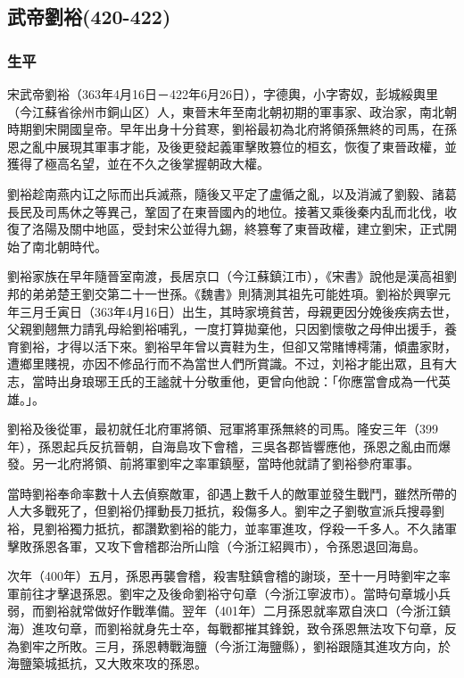 
\subsection{武帝劉裕\tiny(420-422)}

\subsubsection{生平}

宋武帝劉裕（363年4月16日－422年6月26日），字德輿，小字寄奴，彭城綏輿里（今江蘇省徐州市銅山区）人，東晉末年至南北朝初期的軍事家、政治家，南北朝時期劉宋開國皇帝。早年出身十分貧寒，劉裕最初為北府將領孫無終的司馬，在孫恩之亂中展現其軍事才能，及後更發起義軍擊敗篡位的桓玄，恢復了東晉政權，並獲得了極高名望，並在不久之後掌握朝政大權。

劉裕趁南燕内讧之际而出兵滅燕，隨後又平定了盧循之亂，以及消滅了劉毅、諸葛長民及司馬休之等異己，鞏固了在東晉國內的地位。接著又乘後秦内乱而北伐，收復了洛陽及關中地區，受封宋公並得九錫，終篡奪了東晉政權，建立劉宋，正式開始了南北朝時代。

劉裕家族在早年隨晉室南渡，長居京口（今江蘇鎮江市），《宋書》說他是漢高祖劉邦的弟弟楚王劉交第二十一世孫。《魏書》則猜測其祖先可能姓項。劉裕於興寧元年三月壬寅日（363年4月16日）出生，其時家境貧苦，母親更因分娩後疾病去世，父親劉翹無力請乳母給劉裕哺乳，一度打算拋棄他，只因劉懷敬之母伸出援手，養育劉裕，才得以活下來。劉裕早年曾以賣鞋为生，但卻又常賭博樗蒲，傾盡家財，遭鄉里賤視，亦因不修品行而不為當世人們所賞識。不过，刘裕才能出眾，且有大志，當時出身琅琊王氏的王謐就十分敬重他，更曾向他說：「你應當會成為一代英雄。」。

劉裕及後從軍，最初就任北府軍將領、冠軍將軍孫無終的司馬。隆安三年（399年），孫恩起兵反抗晉朝，自海島攻下會稽，三吳各郡皆響應他，孫恩之亂由而爆發。另一北府將領、前將軍劉牢之率軍鎮壓，當時他就請了劉裕參府軍事。

當時劉裕奉命率數十人去偵察敵軍，卻遇上數千人的敵軍並發生戰鬥，雖然所帶的人大多戰死了，但劉裕仍揮動長刀抵抗，殺傷多人。劉牢之子劉敬宣派兵搜尋劉裕，見劉裕獨力抵抗，都讚歎劉裕的能力，並率軍進攻，俘殺一千多人。不久諸軍擊敗孫恩各軍，又攻下會稽郡治所山陰（今浙江紹興市），令孫恩退回海島。

次年（400年）五月，孫恩再襲會稽，殺害駐鎮會稽的謝琰，至十一月時劉牢之率軍前往才擊退孫恩。劉牢之及後命劉裕守句章（今浙江寧波市）。當時句章城小兵弱，而劉裕就常做好作戰準備。翌年（401年）二月孫恩就率眾自浹口（今浙江鎮海）進攻句章，而劉裕就身先士卒，每戰都摧其鋒銳，致令孫恩無法攻下句章，反為劉牢之所敗。三月，孫恩轉戰海鹽（今浙江海鹽縣），劉裕跟隨其進攻方向，於海鹽築城抵抗，又大敗來攻的孫恩。

